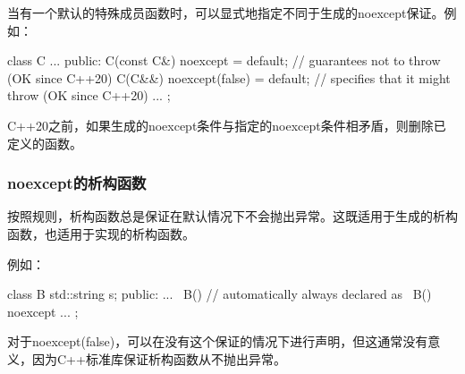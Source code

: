 当有一个默认的特殊成员函数时，可以显式地指定不同于生成的noexcept保证。例如：

\begin{cppcode}
class C
{
	...
public:
	C(const C&) noexcept = default; // guarantees not to throw (OK since C++20)
	C(C&&) noexcept(false) = default; // specifies that it might throw (OK since C++20)
	...
};
\end{cppcode}

C++20之前，如果生成的noexcept条件与指定的noexcept条件相矛盾，则删除已定义的函数。

\subsubsection{noexcept的析构函数}

按照规则，析构函数总是保证在默认情况下不会抛出异常。这既适用于生成的析构函数，也适用于实现的析构函数。

例如：

\begin{cppcode}
class B
{
	std::string s;
	public:
	...
	~B() { // automatically always declared as ~B() noexcept
		...
	}
};
\end{cppcode}

对于noexcept(false)，可以在没有这个保证的情况下进行声明，但这通常没有意义，因为C++标准库保证析构函数从不抛出异常。


































